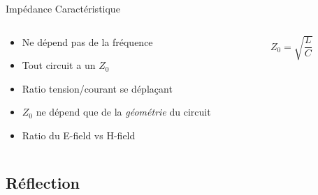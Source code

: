 \begin{frame}{Impédance Caractéristique}
    \begin{columns}
        \begin{column}{0.5\textwidth}
            \begin{itemize}
                \item Ne dépend pas de la fréquence
                \item Tout circuit a un $Z_0$
                \item Ratio tension/courant se déplaçant
                \bigskip
                \item $Z_0$ ne dépend que de la \textit{géométrie} du circuit
                \item Ratio du E-field vs H-field
            \end{itemize}
        \end{column}
        \begin{column}{0.5\textwidth}
            \begin{center}
                \huge{$Z_0 = \sqrt{\dfrac{L}{C}}$}\\
                \vspace{30pt}
            \end{center}
        \end{column}
    \end{columns}
\end{frame}



\subsection[5min-Pascal]{Réflection}
\pascalbackground

